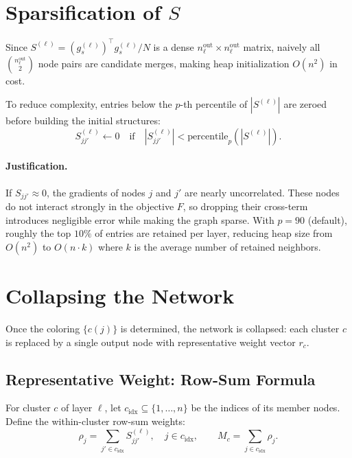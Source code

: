 \documentclass[11pt]{article}
\begin{document}
\section{Sparsification of $S$}

Since $S^{(\ell)} = (g_s^{(\ell)})^\top g_s^{(\ell)} / N$ is a dense
$n_\ell^{\mathrm{out}} \times n_\ell^{\mathrm{out}}$ matrix, naively all
$\binom{n_\ell^{\mathrm{out}}}{2}$ node pairs are candidate merges, making
heap initialization $O(n^2)$ in cost.

To reduce complexity, entries below the $p$-th percentile of $|S^{(\ell)}|$
are zeroed before building the initial structures:
\[
  S^{(\ell)}_{jj'} \gets 0
  \quad\text{if}\quad
  |S^{(\ell)}_{jj'}| < \mathrm{percentile}_p(|S^{(\ell)}|).
\]

\paragraph{Justification.} If $S_{jj'} \approx 0$, the gradients of nodes
$j$ and $j'$ are nearly uncorrelated. These nodes do not interact strongly
in the objective $F$, so dropping their cross-term introduces negligible
error while making the graph sparse. With $p = 90$ (default), roughly the
top $10\%$ of entries are retained per layer, reducing heap size from
$O(n^2)$ to $O(n \cdot k)$ where $k$ is the average number of retained
neighbors.

\section{Collapsing the Network}

Once the coloring $\{c(j)\}$ is determined, the network is collapsed: each
cluster $c$ is replaced by a single output node with representative weight
vector $r_c$.

\subsection{Representative Weight: Row-Sum Formula}

For cluster $c$ of layer $\ell$, let $c_{\mathrm{idx}} \subseteq \{1,\ldots,n\}$
be the indices of its member nodes. Define the within-cluster row-sum weights:
\[
  \rho_j = \sum_{j' \in c_{\mathrm{idx}}} S^{(\ell)}_{jj'}, \quad j \in c_{\mathrm{idx}},
  \qquad M_c = \sum_{j \in c_{\mathrm{idx}}} \rho_j.
\]
\end{document}
